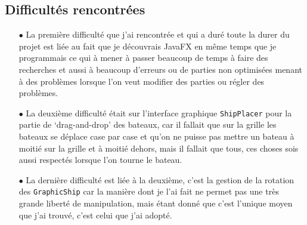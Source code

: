 \documentclass[12pt]{article}
\begin{document}
\subsection{Difficultés rencontrées}
\begin{itemize}
      \item[$\bullet$] La première difficulté que j'ai rencontrée et qui a duré
            toute la durer du projet est liée au fait que je découvrais JavaFX
            en même
            temps que je programmais ce qui à mener à passer beaucoup de temps
            à faire des
            recherches et aussi à beaucoup d'erreurs ou de parties non
            optimisées menant à
            des problèmes lorsque l'on veut modifier des parties ou régler des
            problèmes.
      \item[$\bullet$] La deuxième difficulté était sur l'interface graphique
            \texttt{ShipPlacer} pour la partie de `drag-and-drop' des bateaux,
            car il
            fallait que sur la grille les bateaux se déplace case par case et
            qu'on ne
            puisse pas mettre un bateau à moitié sur la grille et à moitié
            dehors, mais il
            fallait que tous, ces choses sois aussi respectés lorsque l'on
            tourne le
            bateau.
      \item[$\bullet$] La dernière difficulté est liée à la deuxième, c'est la
            gestion de la rotation des \texttt{GraphicShip} car la manière dont
            je l'ai
            fait ne permet pas une très grande liberté de manipulation, mais
            étant donné
            que c'est l'unique moyen que j'ai trouvé, c'est celui que j'ai
            adopté.
\end{itemize}
\end{document}
